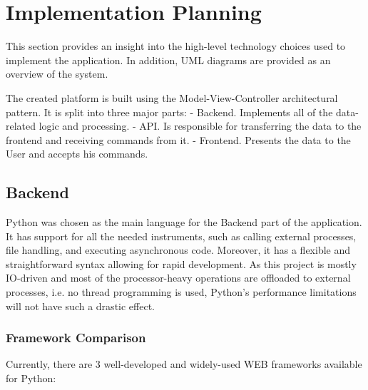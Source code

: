 \chapter{Implementation Planning}
This section provides an insight into the high-level technology choices used to implement the application.
In addition, UML diagrams are provided as an overview of the system.

The created platform is built using the Model-View-Controller\cite{mvc} architectural pattern.
It is split into three major parts:
- Backend. Implements all of the data-related logic and processing.
- API. Is responsible for transferring the data to the frontend and receiving commands from it.
- Frontend. Presents the data to the User and accepts his commands.


\section{Backend}
Python was chosen as the main language for the Backend part of the application.
It has support for all the needed instruments, such as calling external processes,
file handling, and executing asynchronous code. Moreover, it has a flexible and straightforward
syntax allowing for rapid development.
As this project is mostly IO-driven and most of the processor-heavy operations are offloaded to external processes,
i.e. no thread programming is used, Python's performance limitations\cite{gil} will not have such a drastic effect.

\subsection{Framework Comparison}

Currently, there are 3 well-developed and widely-used WEB frameworks available for Python:

